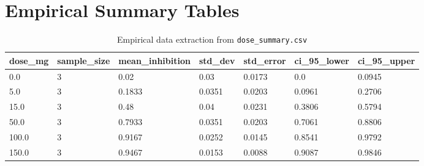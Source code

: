 \documentclass[11pt,a4paper]{article}
\begin{document}
\section{Empirical Summary Tables}
\begin{table}[htbp]
\centering
\small
\begin{tabular}{lllllll}
\toprule
\textbf{dose\_mg} & \textbf{sample\_size} & \textbf{mean\_inhibition} & \textbf{std\_dev} & \textbf{std\_error} & \textbf{ci\_95\_lower} & \textbf{ci\_95\_upper} \\
\midrule
0.0 & 3 & 0.02 & 0.03 & 0.0173 & 0.0 & 0.0945 \\
5.0 & 3 & 0.1833 & 0.0351 & 0.0203 & 0.0961 & 0.2706 \\
15.0 & 3 & 0.48 & 0.04 & 0.0231 & 0.3806 & 0.5794 \\
50.0 & 3 & 0.7933 & 0.0351 & 0.0203 & 0.7061 & 0.8806 \\
100.0 & 3 & 0.9167 & 0.0252 & 0.0145 & 0.8541 & 0.9792 \\
150.0 & 3 & 0.9467 & 0.0153 & 0.0088 & 0.9087 & 0.9846 \\
\bottomrule
\end{tabular}
\caption{Empirical data extraction from \texttt{dose\_summary.csv}}
\label{tab:s1}
\end{table}
\end{document}
